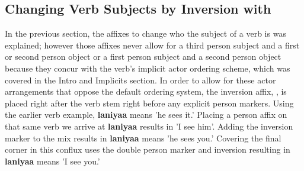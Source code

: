 \subsection{Changing Verb Subjects by Inversion with \infixtext{\verbinv}}
In the previous section, the affixes to change who the subject of a verb is was explained; however those affixes never allow for a third person subject and a first or second person object or a first person subject and a second person object because they concur with the verb's implicit actor ordering scheme, which was covered in the Intro and Implicits section. In order to allow for these actor arrangements that oppose the default ordering system, the inversion affix, \suffixtext{\verbinv}, is placed right after the verb stem right before any explicit person markers. Using the earlier verb example, \textbf{laniyaa} means 'he sees it.' Placing a person affix on that same verb we arrive at \textbf{laniyaa\verbfirst} results in 'I see him'. Adding the inversion marker to the mix results in \textbf{laniyaa\verbinv\verbsecond} means 'he sees you.' Covering the final corner in this conflux uses the double person marker and inversion resulting in \textbf{laniyaa\verbinv\verbonetwo} means 'I see you.'

